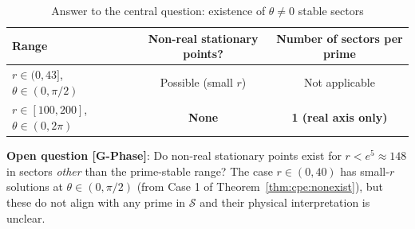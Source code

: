 \documentclass[12pt,a4paper]{article}
\theoremstyle{definition}
\theoremstyle{remark}
\begin{document}
\begin{table}[h]
\centering
\caption{Answer to the central question: existence of $\theta \neq 0$ stable sectors}
\label{tab:cpe:answer}
\begin{tabular}{lcc}
\toprule
Range & Non-real stationary points? & Number of sectors per prime \\
\midrule
$r \in (0, 43]$, $\theta \in (0, \pi/2)$ & Possible (small $r$) & Not applicable \\
$r \in [100, 200]$, $\theta \in (0, 2\pi)$ & \textbf{None} & \textbf{1 (real axis only)} \\
\bottomrule
\end{tabular}
\end{table}

\begin{gapbox}
\textbf{Open question [G-Phase]}: Do non-real stationary points exist for $r < e^5 \approx 148$
in sectors \emph{other} than the prime-stable range?  The case $r \in (0, 40)$ has small-$r$
solutions at $\theta \in (0, \pi/2)$ (from Case 1 of Theorem~\ref{thm:cpe:nonexist}), but these
do not align with any prime in $\mathcal{S}$ and their physical interpretation is unclear.
\end{gapbox}

\ifdefined\INCLUDEMODE
\else
  
\end{document}
